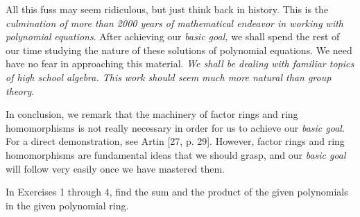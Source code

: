\documentclass[11pt,oneside]{article}
\begin{document}
\begin{BookBody}
All this fuss may seem ridiculous, but just think back in history. This is the\textit{ culmi}\textit{nation of more than 2000 years of mathematical endeavor in working with polynomial} \textit{equations}. After achieving our\textit{ basic goal,} we shall spend the rest of our time studying the nature of these solutions of polynomial equations. We need have no fear in approaching this material.\textit{ We shall be dealing with familiar topics of high school algebra. This} \textit{work should seem much more natural than group theory}.

In conclusion, we remark that the machinery of factor rings and ring homomorphisms is not really necessary in order for us to achieve our\textit{ basic goal}. For a direct demonstration, see Artin [27, p. 29]. However, factor rings and ring homomorphisms are fundamental ideas that we should grasp, and our\textit{ basic goal} will follow very easily once we have mastered them.

\end{BookBody}

\BookNarrativefalse

\begin{BookBody}



\noindent In Exercises 1 through 4, find the sum and the product of the given polynomials in the given polynomial ring.







\end{BookBody}
\end{document}
